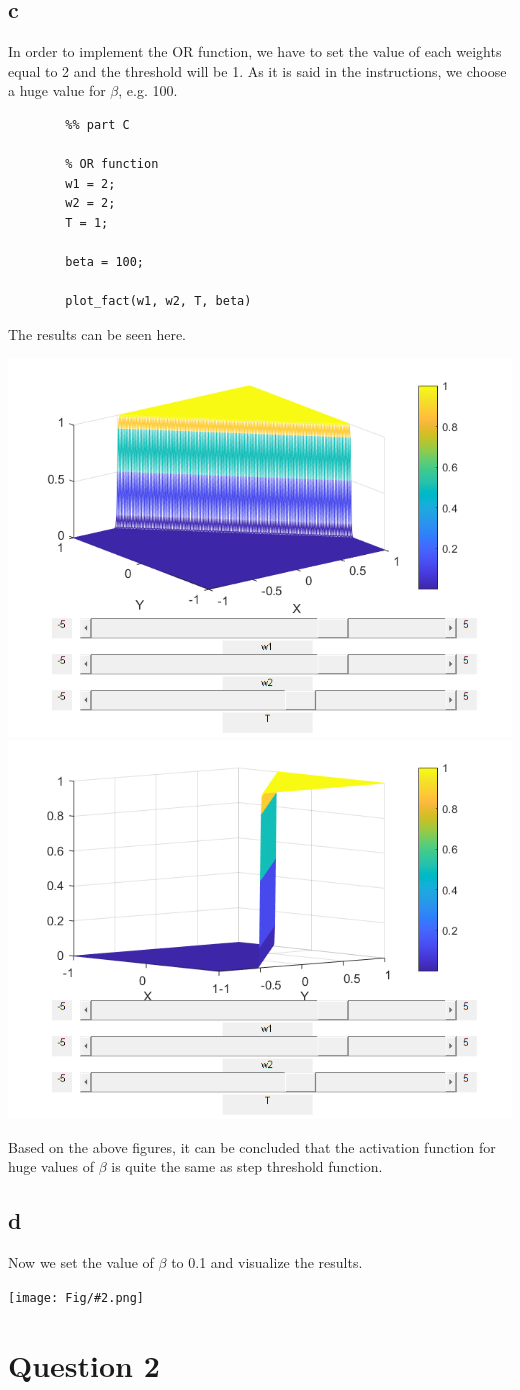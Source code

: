 \documentclass[]{article}
\newcommand{\pict}[2]{\begin{center}
		\texttt{[image: Fig/\#2.png]}
\end{center}}
\begin{document}
	\subsection*{c}
	In order to implement the OR function, we have to set the value of each weights equal to 2 and the threshold will be 1. As it is said in the instructions, we choose a huge value for $\beta$, e.g. 100.
	\begin{lstlisting}
		%% part C
		
		% OR function
		w1 = 2;
		w2 = 2;
		T = 1;
		
		beta = 100;
		
		plot_fact(w1, w2, T, beta)
	\end{lstlisting}
	The results can be seen here.
	\begin{center}
		\includegraphics[width=0.4\linewidth]{Fig/Q1_F4.png}
		\qquad\qquad
		\includegraphics[width=0.4\linewidth]{Fig/Q1_F5.png}
	\end{center}
	Based on the above figures, it can be concluded that the activation function for huge values of $\beta$ is quite the same as step threshold function.
	
	\subsection*{d}
	Now we set the value of $\beta$ to 0.1 and visualize the results.
	\pict{0.5}{Q1_F6}
	
	\section{Question 2}
\end{document}
